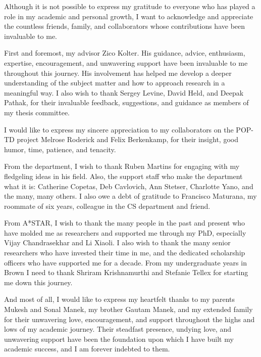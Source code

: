 \documentclass[12pt]{cmuthesis}
\begin{document}
\begin{acknowledgments}
	Although it is not possible to express my gratitude to everyone who has played a role in my academic and personal growth, I want to acknowledge and appreciate the countless friends, family, and collaborators whose contributions have been invaluable to me.

	First and foremost, my advisor Zico Kolter. His guidance, advice, enthusiasm, expertise, encouragement, and unwavering support have been invaluable to me throughout this journey. His involvement has helped me develop a deeper understanding of the subject matter and how to approach research in a meaningful way. I also wish to thank Sergey Levine, David Held, and Deepak Pathak, for their invaluable feedback, suggestions, and guidance as members of my thesis committee.

	I would like to express my sincere appreciation to my collaborators on the POP-TD project Melrose Roderick and Felix Berkenkamp, for their insight, good humor, time, patience, and tenacity.

	From the department, I wish to thank Ruben Martins for engaging with my fledgeling ideas in his field. Also, the support staff who make the department what it is: Catherine Copetas, Deb Cavlovich, Ann Stetser, Charlotte Yano, and the many, many others. I also owe a debt of gratitude to Francisco Maturana, my roommate of six years, colleague in the CS department and friend.

	\clearpage

	From A*STAR, I wish to thank the many people in the past and present who have molded me as researchers and supported me through my PhD, especially Vijay Chandrasekhar and Li Xiaoli. I also wish to thank the many senior researchers who have invested their time in me, and the dedicated scholarship officers who have supported me for a decade. From my undergraduate years in Brown I need to thank Shriram Krishnamurthi and Stefanie Tellex for starting me down this journey.

	And most of all, I would like to express my heartfelt thanks to my parents Mukesh and Sonal Manek, my brother Gautam Manek, and my extended family for their unwavering love, encouragement, and support throughout the highs and lows of my academic journey. Their steadfast presence, undying love, and unwavering support have been the foundation upon which I have built my academic success, and I am forever indebted to them.
\end{acknowledgments}
\end{document}
